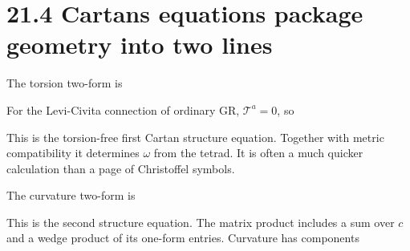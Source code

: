 \documentclass[
  11pt,
  letterpaper,
  oneside,
  openany]{scrbook}
\begin{document}
\hypertarget{cartans-equations-package-geometry-into-two-lines}{%
\section{21.4 Cartan\textquotesingle s equations package geometry into
two lines}\label{cartans-equations-package-geometry-into-two-lines}}

The torsion two-form is

\begin{center}
\begingroup
{}
\ifdim\wd\grmathbox>\linewidth
\resizebox{\linewidth}{!}{\usebox{\grmathbox}}
\else\usebox{\grmathbox}\fi
\endgroup
\end{center}

For the Levi-Civita connection of ordinary GR, \(\mathcal T^a=0\), so

\begin{center}
\begingroup
{}
\ifdim\wd\grmathbox>\linewidth
\resizebox{\linewidth}{!}{\usebox{\grmathbox}}
\else\usebox{\grmathbox}\fi
\endgroup
\end{center}

This is the torsion-free first Cartan structure equation. Together with
metric compatibility it determines \(\omega\) from the tetrad. It is
often a much quicker calculation than a page of Christoffel symbols.

The curvature two-form is

\begin{center}
\begingroup
{}
\ifdim\wd\grmathbox>\linewidth
\resizebox{\linewidth}{!}{\usebox{\grmathbox}}
\else\usebox{\grmathbox}\fi
\endgroup
\end{center}

This is the second structure equation. The matrix product includes a sum
over \(c\) and a wedge product of its one-form entries. Curvature has
components

\begin{center}
\begingroup
{}
\ifdim\wd\grmathbox>\linewidth
\resizebox{\linewidth}{!}{\usebox{\grmathbox}}
\else\usebox{\grmathbox}\fi
\endgroup
\end{center}
\end{document}
